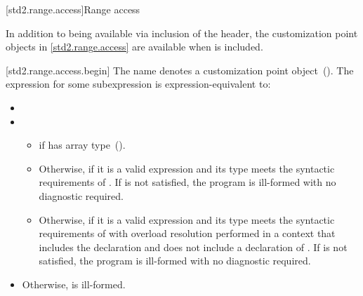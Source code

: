 [std2.range.access]{Range access}

\pnum
In addition to being available via inclusion of the 
header, the customization point objects in \ref{std2.range.access} are
available when  is included.

[std2.range.access.begin]{}
\pnum
The name  denotes a customization point
 object~(). The expression
 for some subexpression  is expression-equivalent to:

\begin{itemize}
\item

\item {}
  \begin{itemize}
  \item
      if  has array
    type~().

  \item
    Otherwise,  if it is a valid expression and its type  meets the
    syntactic requirements of . If
     is not satisfied, the program is ill-formed
    with no diagnostic required.

  \item
    Otherwise,  if it is a valid expression and its type  meets the
    syntactic requirements of  with overload
    resolution performed in a context that includes the declaration
     and does not include
    a declaration of . If 
    is not satisfied, the program is ill-formed with no diagnostic
    required.
  \end{itemize}

\item
  Otherwise,  is ill-formed.
\end{itemize}

